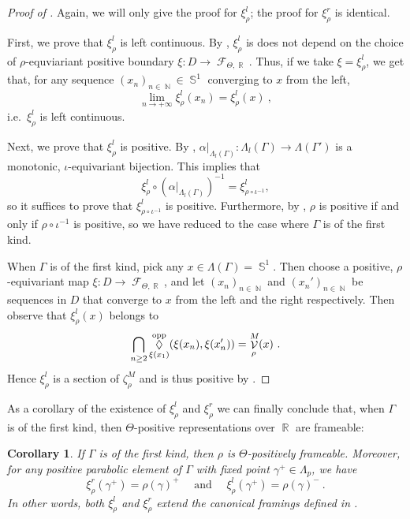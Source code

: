 \documentclass{amsart}
\theoremstyle{plain}
\newtheorem{corollary}[proposition]{Corollary}
\theoremstyle{definition}
\DeclareMathOperator{\Diam}{\lozenge}
\DeclareMathOperator{\Fc}{\mathcal{F}}
\DeclareMathOperator{\Vc}{\mathcal{V}}
\DeclareMathOperator{\Nb}{{\mathbb{N}}}
\DeclareMathOperator{\Rb}{{\mathbb{R}}}
\DeclareMathOperator{\Sb}{\mathbb{S}}
\newcommand{\opp}{\textnormal{opp}}
\newcommand{\1}{\mathbf{1}}
\begin{document}
\begin{proof}[Proof of ]
Again, we will only give the proof for $\xi_\rho^l$; the proof for $\xi_\rho^r$ is identical. 

First, we prove that $\xi_\rho^l$ is left continuous. By , $\xi^l_\rho$ is does not depend on the choice of $\rho$-equviariant positive boundary $\xi:D\to\Fc_{\Theta,\Rb}$. Thus, if we take $\xi=\xi^l_\rho$, we get that, for any sequence $(x_n)_{n\in \Nb}\in \Sb^1$ converging to $x$ from the left,
    \[\lim_{n\to +\infty} \xi^l_\rho(x_n) = \xi^l_\rho(x)~,\]
    i.e.\ $\xi^l_\rho$ is left continuous.

Next, we prove that $\xi_\rho^l$ is positive. By , $\alpha|_{\Lambda_l(\Gamma)}:\Lambda_l(\Gamma)\to\Lambda(\Gamma')$ is a monotonic, $\iota$-equivariant bijection. This implies that 
\[\xi_\rho^l\circ(\alpha|_{\Lambda_l(\Gamma)})^{-1}=\xi_{\rho\circ\iota^{-1}}^l,\]
so it suffices to prove that $\xi_{\rho\circ\iota^{-1}}^l$ is positive. Furthermore, by , $\rho$ is positive if and only if $\rho\circ\iota^{-1}$ is positive, so we have reduced to the case where $\Gamma$ is of the first kind.

When $\Gamma$ is of the first kind, pick any $x\in\Lambda(\Gamma) = \Sb^1$. Then choose a positive, $\rho$-equivariant map $\xi:D\to\Fc_{\Theta,\Rb}$, and let $(x_n)_{n\in\Nb}$ and $(x_n')_{n\in\Nb}$ be sequences in $D$ that converge to $x$ from the left and the right respectively. Then observe that $\xi^l_\rho(x)$ belongs to
    \[\bigcap_{n\ge 2} \Diam_{\xi(x_1)}^\opp(\xi(x_n), \xi(x'_n)) = \Vc^M_\rho(x)~.\]
    Hence $\xi^l_\rho$ is a section of $\zeta^M_\rho$ and is thus positive by .
\end{proof}

As a corollary of the existence of $\xi_\rho^l$ and $\xi_\rho^r$ we can finally conclude that, when $\Gamma$ is of the first kind, then $\Theta$-positive representations over $\Rb$ are frameable:

\begin{corollary} \label{coro: positive => frameable over R}
    If $\Gamma$ is of the first kind, then $\rho$ is $\Theta$-positively frameable. Moreover, for any positive parabolic element of $\Gamma$ with fixed point $\gamma^+\in \Lambda_p$, we have
    \[\xi^r_\rho(\gamma^+) = \rho(\gamma)^+ \quad \textrm{ and } \quad \xi^l_\rho(\gamma^+) = \rho(\gamma)^-~.\]
    In other words, both $\xi^l_\rho$ and $\xi^r_\rho$ extend the canonical framings defined in .
\end{corollary}
\end{document}
